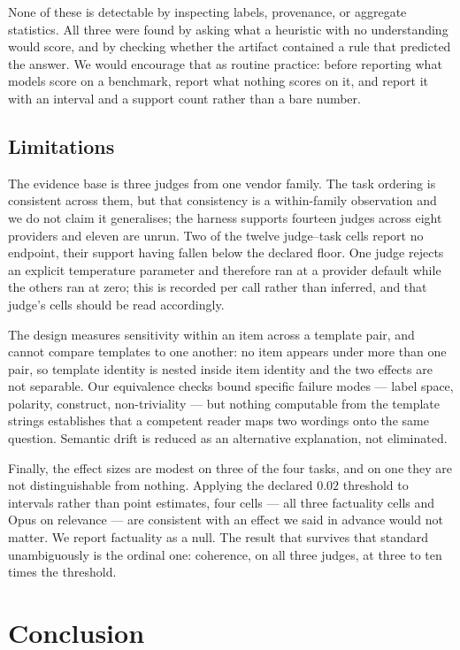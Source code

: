 \documentclass[11pt]{article}          %
\begin{document}
None of these is detectable by inspecting labels, provenance, or aggregate
statistics. All three were found by asking what a heuristic with no understanding
would score, and by checking whether the artifact contained a rule that predicted
the answer. We would encourage that as routine practice: before reporting what
models score on a benchmark, report what nothing scores on it, and report it
with an interval and a support count rather than a bare number.

\subsection{Limitations}

The evidence base is three judges from one vendor family. The task ordering is
consistent across them, but that consistency is a within-family observation and
we do not claim it generalises; the harness supports fourteen judges across eight
providers and eleven are unrun. Two of the twelve judge--task cells report no
endpoint, their support having fallen below the declared floor. One judge
rejects an explicit temperature parameter and therefore ran at a provider
default while the others ran at zero; this is recorded per call rather than
inferred, and that judge's cells should be read accordingly.

The design measures sensitivity within an item across a template pair, and cannot
compare templates to one another: no item appears under more than one pair, so
template identity is nested inside item identity and the two effects are not
separable. Our equivalence checks bound specific failure modes --- label space,
polarity, construct, non-triviality --- but nothing computable from the template
strings establishes that a competent reader maps two wordings onto the same
question. Semantic drift is reduced as an alternative explanation, not
eliminated.

Finally, the effect sizes are modest on three of the four tasks, and on one they
are not distinguishable from nothing. Applying the declared $0.02$ threshold to
intervals rather than point estimates, four cells --- all three factuality cells
and Opus on relevance --- are consistent with an effect we said in advance would
not matter. We report factuality as a null. The result that survives that
standard unambiguously is the ordinal one: coherence, on all three judges, at
three to ten times the threshold.

\section{Conclusion}
\end{document}
